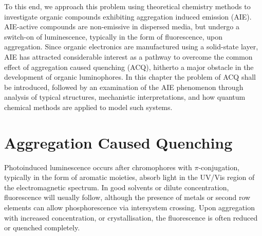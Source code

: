 To this end, we approach this problem using theoretical chemistry methods to investigate organic compounds exhibiting aggregation induced emission (AIE).  AIE-active compounds are non-emissive in dispersed media, but undergo a switch-on of luminescence, typically in the form of fluorescence, upon aggregation. Since organic electronics are manufactured using a solid-state layer, AIE has attracted considerable interest as a pathway to overcome the common effect of aggregation caused quenching (ACQ), hitherto a major obstacle in the development of organic luminophores. In this chapter the problem of ACQ shall be introduced, followed by an examination of the AIE phenomenon through analysis of typical structures, mechanistic interpretations, and how quantum chemical methods are applied to model such systems.
\section{Aggregation Caused Quenching}\label{section: lom ACQ}
Photoinduced luminescence occurs after chromophores with $\pi$-conjugation, typically in the form of aromatic moieties, absorb light in the UV/Vis region of the electromagnetic spectrum. In good solvents or dilute concentration, fluorescence will usually follow, although the presence of metals or second row elements can allow phosphorescence via intersystem crossing. Upon aggregation with increased concentration, or crystallisation, the fluorescence is often reduced or quenched completely. 

